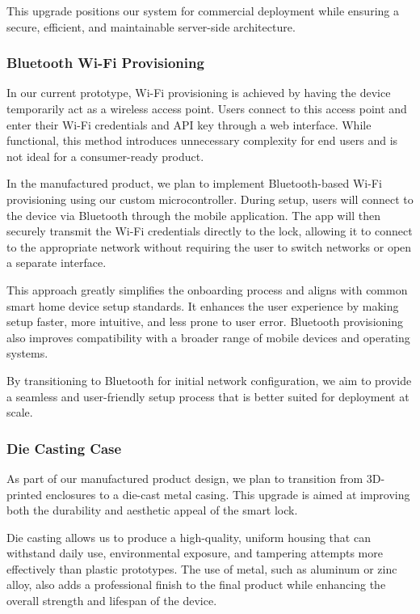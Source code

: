This upgrade positions our system for commercial deployment while ensuring a secure, efficient, and maintainable server-side architecture.


\subsubsection{Bluetooth Wi-Fi Provisioning}

In our current prototype, Wi-Fi provisioning is achieved by having the device temporarily act as a wireless access point. Users connect to this access point and enter their Wi-Fi credentials and API key through a web interface. While functional, this method introduces unnecessary complexity for end users and is not ideal for a consumer-ready product.

In the manufactured product, we plan to implement Bluetooth-based Wi-Fi provisioning using our custom microcontroller. During setup, users will connect to the device via Bluetooth through the mobile application. The app will then securely transmit the Wi-Fi credentials directly to the lock, allowing it to connect to the appropriate network without requiring the user to switch networks or open a separate interface.

This approach greatly simplifies the onboarding process and aligns with common smart home device setup standards. It enhances the user experience by making setup faster, more intuitive, and less prone to user error. Bluetooth provisioning also improves compatibility with a broader range of mobile devices and operating systems.

By transitioning to Bluetooth for initial network configuration, we aim to provide a seamless and user-friendly setup process that is better suited for deployment at scale.


\subsubsection{Die Casting Case}

As part of our manufactured product design, we plan to transition from 3D-printed enclosures to a die-cast metal casing. This upgrade is aimed at improving both the durability and aesthetic appeal of the smart lock.

Die casting allows us to produce a high-quality, uniform housing that can withstand daily use, environmental exposure, and tampering attempts more effectively than plastic prototypes. The use of metal, such as aluminum or zinc alloy, also adds a professional finish to the final product while enhancing the overall strength and lifespan of the device.

